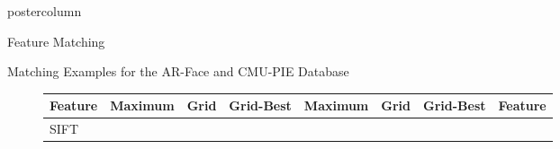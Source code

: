\documentclass[final,hyperref={pdfpagelabels=false}]{beamer}
\begin{document}
\begin{frame}
\begin{columns}
\begin{column}{.49\textwidth}
\begin{beamercolorbox}[center,wd=\textwidth]{postercolumn}
\begin{minipage}[T]{.95\textwidth}
{\begin{block}{Feature Matching}
            \end{block}
            \vfill
            \begin{block}{Matching Examples for the AR-Face and CMU-PIE Database}
              \begin{figure}
                \footnotesize
                \centering
                \begin{tabular}{p{.09\linewidth} | p{.12\linewidth} | p{.12\linewidth} | p{.12\linewidth} || p{.12\linewidth} | p{.12\linewidth} | p{.12\linewidth} | p{.09\linewidth} }
                  Feature
                  &
                  Maximum
                  &
                  Grid
                  &
                  Grid-Best
                  &
                  Maximum
                  &
                  Grid
                  &
                  Grid-Best
                  &
                  Feature
                  \\
                  \hline
                  SIFT
                  &

\end{tabular}
\end{figure}
\end{block}}
\end{minipage}
\end{beamercolorbox}
\end{column}
\end{columns}
\end{frame}
\end{document}
